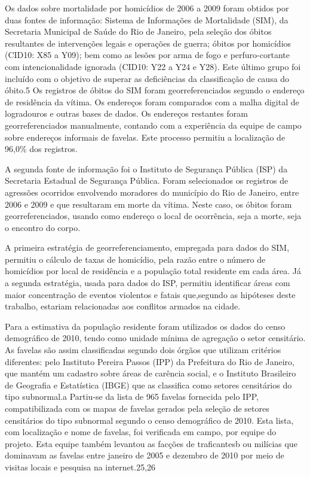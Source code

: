 \documentclass{article}
\begin{document}
Os dados sobre mortalidade por homicídios de 2006 a 2009 foram obtidos por duas
fontes de informação: Sistema de Informações de Mortalidade (SIM), da Secretaria
Municipal de Saúde do Rio de Janeiro, pela seleção dos óbitos resultantes de
intervenções legais e operações de guerra; óbitos por homicídios (CID10: X85 a
Y09); bem como as lesões por arma de fogo e perfuro-cortante com
intencionalidade ignorada (CID10: Y22 a Y24 e Y28). Este último grupo foi
incluído com o objetivo de superar as deficiências da classificação de causa do
óbito.5 Os registros de óbitos do SIM foram georreferenciados segundo o endereço
de residência da vítima. Os endereços foram comparados com a malha digital de
logradouros e outras bases de dados. Os endereços restantes foram
georreferenciados manualmente, contando com a experiência da equipe de campo
sobre endereços informais de favelas. Este processo permitiu a localização de
96,0\% dos registros.

A segunda fonte de informação foi o Instituto de Segurança Pública (ISP) da
Secretaria Estadual de Segurança Pública. Foram selecionados os registros de
agressões ocorridos envolvendo moradores do município do Rio de Janeiro, entre
2006 e 2009 e que resultaram em morte da vítima. Neste caso, os óbitos foram
georreferenciados, usando como endereço o local de ocorrência, seja a morte,
seja o encontro do corpo.

A primeira estratégia de georreferenciamento, empregada para dados do SIM,
permitiu o cálculo de taxas de homicídio, pela razão entre o número de
homicídios por local de residência e a população total residente em cada área.
Já a segunda estratégia, usada para dados do ISP, permitiu identificar áreas com
maior concentração de eventos violentos e fatais que,segundo as hipóteses deste
trabalho, estariam relacionadas aos conflitos armados na cidade.

Para a estimativa da população residente foram utilizados os dados do censo
demográfico de 2010, tendo como unidade mínima de agregação o setor censitário.
As favelas são assim classificadas segundo dois órgãos que utilizam critérios
diferentes: pelo Instituto Pereira Passos (IPP) da Prefeitura do Rio de Janeiro,
que mantém um cadastro sobre áreas de carência social, e o Instituto Brasileiro
de Geografia e Estatística (IBGE) que as classifica como setores censitários do
tipo subnormal.a Partiu-se da lista de 965 favelas fornecida pelo IPP,
compatibilizada com os mapas de favelas gerados pela seleção de setores
censitários do tipo subnormal segundo o censo demográfico de 2010. Esta lista,
com localização e nome de favelas, foi verificada em campo, por equipe do
projeto. Esta equipe também levantou as facções de traficantesb ou milícias que
dominavam as favelas entre janeiro de 2005 e dezembro de 2010 por meio de
visitas locais e pesquisa na internet.25,26
\end{document}
